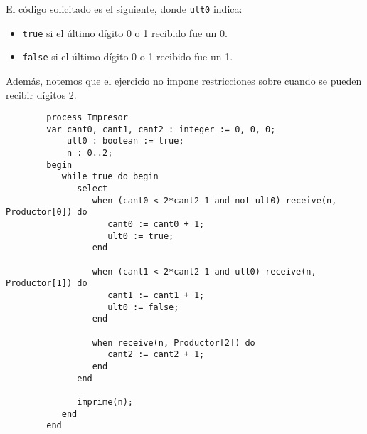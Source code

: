 \begin{ejercicio}
    El código solicitado es el siguiente, donde \verb|ult0| indica:
    \begin{itemize}
        \item \verb|true| si el último dígito 0 o 1 recibido fue un 0.
        \item \verb|false| si el último dígito 0 o 1 recibido fue un 1.
    \end{itemize}
    Además, notemos que el ejercicio no impone restricciones sobre cuando se pueden recibir dígitos 2.
    \begin{verbatim}
        process Impresor
        var cant0, cant1, cant2 : integer := 0, 0, 0;
            ult0 : boolean := true;
            n : 0..2;
        begin
           while true do begin
              select
                 when (cant0 < 2*cant2-1 and not ult0) receive(n, Productor[0]) do
                    cant0 := cant0 + 1;
                    ult0 := true;
                 end

                 when (cant1 < 2*cant2-1 and ult0) receive(n, Productor[1]) do
                    cant1 := cant1 + 1;
                    ult0 := false;
                 end

                 when receive(n, Productor[2]) do
                    cant2 := cant2 + 1;
                 end
              end

              imprime(n);
           end
        end
    \end{verbatim}
\end{ejercicio}

